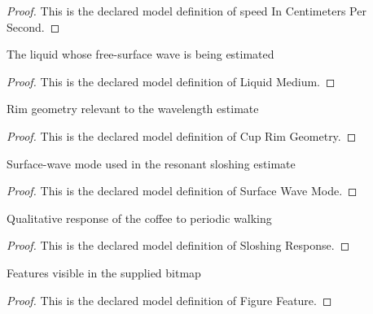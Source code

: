 \begin{proof}
  This is the declared model definition of speed In Centimeters Per Second.
\end{proof}
\begin{definition}
  \label{def:physics:phyx-mini-0206:phyxminiproblems-problemphyxmini0206-liquidmedium}
  The liquid whose free-surface wave is being estimated
\end{definition}
\begin{proof}
  This is the declared model definition of Liquid Medium.
\end{proof}
\begin{definition}
  \label{def:physics:phyx-mini-0206:phyxminiproblems-problemphyxmini0206-cuprimgeometry}
  Rim geometry relevant to the wavelength estimate
\end{definition}
\begin{proof}
  This is the declared model definition of Cup Rim Geometry.
\end{proof}
\begin{definition}
  \label{def:physics:phyx-mini-0206:phyxminiproblems-problemphyxmini0206-surfacewavemode}
  Surface-wave mode used in the resonant sloshing estimate
\end{definition}
\begin{proof}
  This is the declared model definition of Surface Wave Mode.
\end{proof}
\begin{definition}
  \label{def:physics:phyx-mini-0206:phyxminiproblems-problemphyxmini0206-sloshingresponse}
  Qualitative response of the coffee to periodic walking
\end{definition}
\begin{proof}
  This is the declared model definition of Sloshing Response.
\end{proof}
\begin{definition}
  \label{def:physics:phyx-mini-0206:phyxminiproblems-problemphyxmini0206-figurefeature}
  Features visible in the supplied bitmap
\end{definition}
\begin{proof}
  This is the declared model definition of Figure Feature.
\end{proof}
